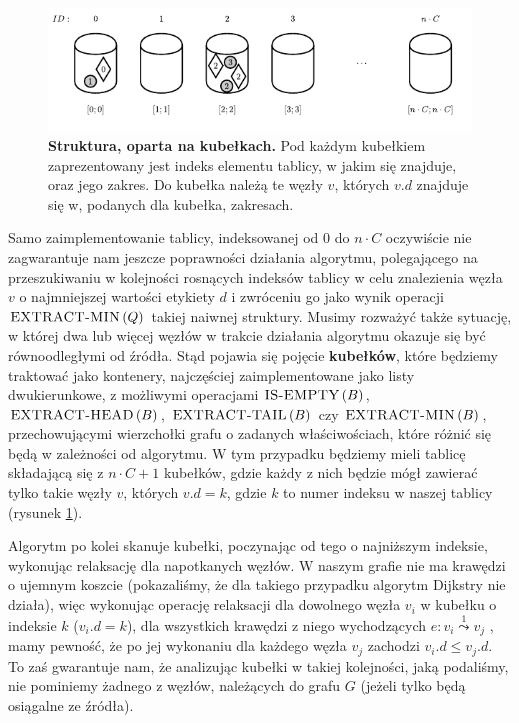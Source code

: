 \begin{figure}[!htbp]
	\centering
	\includegraphics[width=\textwidth]{Chapter_II/SIMPLE-BUCKET-Example/a.pdf}
	\caption{ \textbf{Struktura, oparta na kubełkach.} Pod każdym kubełkiem zaprezentowany jest indeks elementu tablicy, w jakim się znajduje, oraz jego zakres. Do kubełka należą te węzły $v$, których $v.d$ znajduje się w, podanych dla kubełka, zakresach. } \label{fig:exampleSimpleBucket}
\end{figure}

Samo zaimplementowanie tablicy, indeksowanej od $0$ do $n \cdot C$ oczywiście nie zagwarantuje nam jeszcze poprawności działania algorytmu, polegającego na przeszukiwaniu w kolejności rosnących indeksów tablicy w celu znalezienia węzła $v$ o najmniejszej wartości etykiety $d$ i zwróceniu go jako wynik operacji $\textrm{\textsc{EXTRACT-MIN}} \left( Q \right)$ takiej naiwnej struktury. Musimy rozważyć także sytuację, w której dwa lub więcej węzłów w trakcie działania algorytmu okazuje się być równoodległymi od źródła. Stąd pojawia się pojęcie \textbf{kubełków}, które będziemy traktować jako kontenery, najczęściej zaimplementowane jako listy dwukierunkowe, z możliwymi operacjami $\textrm{\textsc{IS-EMPTY}} \left( B \right)$, $\textrm{\textsc{EXTRACT-HEAD}} \left( B \right)$, $\textrm{\textsc{EXTRACT-TAIL}} \left( B \right)$ czy $\textrm{\textsc{EXTRACT-MIN}} \left( B \right)$, przechowującymi wierzchołki grafu o zadanych właściwościach, które różnić się będą w zależności od algorytmu. W tym przypadku będziemy mieli tablicę składającą się z $n \cdot C + 1$ kubełków, gdzie każdy z nich będzie mógł zawierać tylko takie węzły $v$, których $v.d = k$, gdzie $k$ to numer indeksu w naszej tablicy (rysunek \ref{fig:exampleSimpleBucket}). 

Algorytm po kolei skanuje kubełki, poczynając od tego o najniższym indeksie, wykonując relaksację dla napotkanych węzłów. W naszym grafie nie ma krawędzi o ujemnym koszcie (pokazaliśmy, że dla takiego przypadku algorytm Dijkstry nie działa), więc wykonując operację relaksacji dla dowolnego węzła $v_{i}$ w kubełku o indeksie $k$ ($v_{i}.d = k$), dla wszystkich krawędzi z niego wychodzących $e : v_{i} \overset{1}\leadsto v_{j}$ , mamy pewność, że po jej wykonaniu dla każdego węzła $v_{j}$ zachodzi $v_{i}.d \leqslant v_{j}.d$. To zaś gwarantuje nam, że analizując kubełki w takiej kolejności, jaką podaliśmy, nie pominiemy żadnego z węzłów, należących do grafu $G$ (jeżeli tylko będą osiągalne ze źródła).

